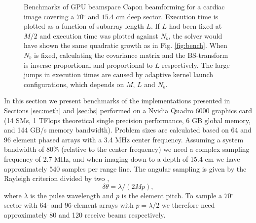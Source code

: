 \documentclass[journal]{IEEEtran}
\newcommand{\degree}{\ensuremath{^\circ}}
\begin{document}
\begin{figure}[!t]
\centerline{
\hfil
{}}
\caption{Benchmarks of GPU beamspace Capon beamforming for a cardiac image covering a $70 \degree$ and $15.4$ cm deep sector. Execution time is plotted as a function of subarray length $L$.  If $L$ had been fixed at $M/2$ and execution time was plotted against $N_b$, the solver would have shown the same quadratic growth as in Fig. \ref{fig:bench}. When $N_b$ is fixed, calculating the covariance matrix and the BS-transform is inverse proportional and proportional to $L$ respectively. The large jumps in execution times are caused by adaptive kernel launch configurations, which depends on $M$, $L$ and $N_b$.}
\label{fig:benchBS}
\end{figure}
In this section we present benchmarks of the implementations presented in Sections \ref{sec:meth} and \ref{sec:bs} performed on a Nvidia Quadro 6000 graphics card (14 SMs, 1 TFlops theoretical single precision performance, 6 GB global memory, and 144 GB/s memory bandwidth). Problem sizes are calculated based on 64 and 96 element phased arrays with a 3.4 MHz center frequency. Assuming a system bandwidth of 80\% (relative to the center frequency) we need a complex sampling frequency of 2.7 MHz, and when imaging down to a depth of 15.4 cm we have approximately 540 samples per range line. The angular sampling is given by the Rayleigh criterion divided by two \cite{Hergum2007}, 
\begin{equation}\label{eq:rayleigh}
\delta{}\theta = \lambda/(2Mp),
\end{equation}
where $\lambda$ is the pulse wavelength and $p$ is the element pitch. 
To sample a $70\degree$ sector with $64$- and $96$-element arrays with $p=\lambda/2$ we therefore need approximately 80 and 120 receive beams respectively. 
\end{document}
